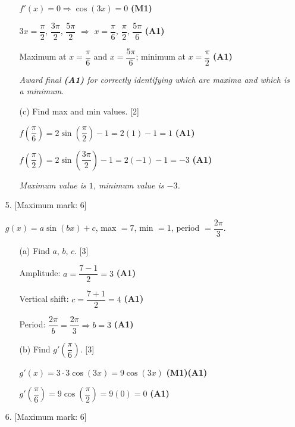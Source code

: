 \documentclass[12pt, twoside]{article}
\begin{document}
\begin{enumerate}
\begin{enumerate}
$f'(x) = 0 \Rightarrow \cos(3x) = 0$ \hfill \textbf{(M1)}

$3x = \dfrac{\pi}{2},\, \dfrac{3\pi}{2},\, \dfrac{5\pi}{2}$
\quad $\Rightarrow$ \quad
$x = \dfrac{\pi}{6},\, \dfrac{\pi}{2},\, \dfrac{5\pi}{6}$ \hfill \textbf{(A1)}

Maximum at $x = \dfrac{\pi}{6}$ and $x = \dfrac{5\pi}{6}$;
\quad minimum at $x = \dfrac{\pi}{2}$ \hfill \textbf{(A1)}

\textit{Award final \textbf{(A1)} for correctly identifying which are maxima and which is a minimum.}

\item[(c)] Find max and min values. \hfill [2]

$f\!\left(\dfrac{\pi}{6}\right) = 2\sin\!\left(\dfrac{\pi}{2}\right) - 1
= 2(1) - 1 = 1$ \hfill \textbf{(A1)}

$f\!\left(\dfrac{\pi}{2}\right) = 2\sin\!\left(\dfrac{3\pi}{2}\right) - 1
= 2(-1) - 1 = -3$ \hfill \textbf{(A1)}

\textit{Maximum value is $1$, minimum value is $-3$.}
\end{enumerate}

\newpage

\item[5.] [Maximum mark: 6]

$g(x) = a\sin(bx) + c$, max $= 7$, min $= 1$, period $= \dfrac{2\pi}{3}$.

\begin{enumerate}
\item[(a)] Find $a$, $b$, $c$. \hfill [3]

Amplitude: $a = \dfrac{7 - 1}{2} = 3$ \hfill \textbf{(A1)}

Vertical shift: $c = \dfrac{7 + 1}{2} = 4$ \hfill \textbf{(A1)}

Period: $\dfrac{2\pi}{b} = \dfrac{2\pi}{3} \Rightarrow b = 3$ \hfill \textbf{(A1)}

\item[(b)] Find $g'\!\left(\dfrac{\pi}{6}\right)$. \hfill [3]

$g'(x) = 3 \cdot 3\cos(3x) = 9\cos(3x)$ \hfill \textbf{(M1)(A1)}

$g'\!\left(\dfrac{\pi}{6}\right) = 9\cos\!\left(\dfrac{\pi}{2}\right) = 9(0) = 0$ \hfill \textbf{(A1)}
\end{enumerate}
\vspace{0.5cm}

\item[6.] [Maximum mark: 6]


\end{enumerate}
\end{document}
